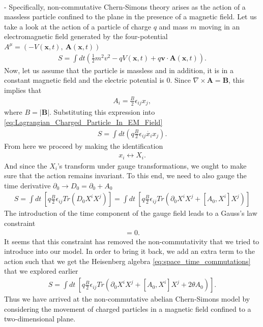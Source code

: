     \\ 
    - Specifically, non-commutative Chern-Simons theory arises as the action of a massless particle confined to the plane in the presence of a magnetic field. \cite{hep-th/0103013} Let us take a look at the action of a particle of charge $q$ and mass $m$ moving in an electromagnetic field generated by the four-potential $A^{\mu} = \left(-V(\bm{x}, t), \ \bm{A}(\bm{x},t)\right)$
    \begin{align}
        S = \int dt \left(\frac{1}{2} m^2 v^2 - q V(\bm{x},t) + q \bm{v} \cdot \bm{A}(\bm{x},t)\right). \label{eq:Lagrangian_Charged_Particle_In_EM_Field}
    \end{align}
    Now, let us assume that the particle is massless and in addition, it is in a constant magnetic field and the electric potential is 0. Since $\nabla \times \bm{A} = \bm{B}$, this implies that
    \begin{align}
        A_i = \frac{B}{2} \epsilon_{i j} x_j,
    \end{align}
    where $B= |\bm{B}|$.
    Substituting this expression into \eqref{eq:Lagrangian_Charged_Particle_In_EM_Field}
    \begin{align}
        S = \int dt \left( q \frac{B}{2}\epsilon_{i j} \dot{x_i} x_j \right).
    \end{align}
    From here we proceed by making the identification
    \begin{align}
        x_i \leftrightarrow X_i.
    \end{align}
    And since the $X_i$'s transform under gauge transformations, we ought to make sure that the action remains invariant. To this end, we need to also gauge the time derivative $\partial_0 \rightarrow D_0 = \partial_0 +A_0$
    \begin{align}
        S = \int dt \ \left[ q \frac{B}{2} \epsilon_{ij} Tr \left(D_0 X^i X^j \right) \right] = \int dt \ \left[ q \frac{B}{2} \epsilon_{ij} Tr \left(\partial_0 X^i X^j + [A_0, X^i] X^j \right) \right]
    \end{align}
    The introduction of the time component of the gauge field leads to a Gauss's law constraint
    \begin{align}
        [X^1, X^2] =0.
    \end{align}
    It seems that this constraint has removed the non-commutativity that we tried to introduce into our model. In order to bring it back, we add an extra term to the action such that we get the Heisenberg algebra \eqref{eq:space_time_commutations} that we explored earlier
    \begin{align}
        S =\int dt \ \left[ q \frac{B}{2} \epsilon_{ij} Tr \left(\partial_0 X^i X^j + [A_0, X^i] X^j + 2 \theta A_0 \right) \right].
    \end{align}
    Thus we have arrived at the non-commutative abelian Chern-Simons model by considering the movement of charged particles in a magnetic field confined to a two-dimensional plane.

    

